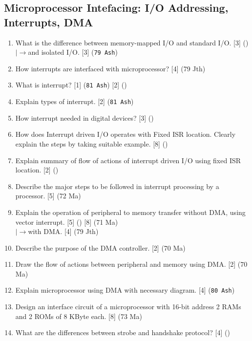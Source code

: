 \documentclass[12pt]{article}
\newcommand{\lb}{\\$\left|\rightarrow\right.$}
\begin{document}
  \subsection{Microprocessor Intefacing: I/O Addressing, Interrupts, DMA}
    \begin{enumerate}
      \item What is the difference between memory-mapped I/O and standard I/O. \hfill [3] ()
        \lb and isolated I/O. \hfill [3] (\texttt{79 Ash})

      \item How interrupts are interfaced with microprocessor? \hfill [4] (79 Jth)

      \item What is interrupt? \hfill [1] (\texttt{81 Ash}) [2] ()

      \item Explain types of interrupt. \hfill [2] (\texttt{81 Ash})

      \item How interrupt needed in digital devices? \hfill [3] ()

      \item How does Interrupt driven I/O operates with Fixed ISR location. Clearly explain the steps by taking suitable example. \hfill [8] ()

      \item Explain summary of flow of actions of interrupt driven I/O using fixed ISR location. \hfill [2] ()
   
      \item Describe the major steps to be followed in interrupt processing by a processor. \hfill [5] (72 Ma)

      \item Explain the operation of peripheral to memory transfer without DMA, using vector interrupt. \hfill [5] () [8] (71 Ma)
        \lb with DMA. \hfill [4] (79 Jth)

      \item Describe the purpose of the DMA controller. \hfill [2] (70 Ma)

      \item Draw the flow of actions between peripheral and memory using DMA. \hfill [2] (70 Ma)

      \item Explain microprocessor using DMA with necessary diagram. \hfill [4] (\texttt{80 Ash})

      \item Design an interface circuit of a microprocessor with 16-bit address 2 RAMs and 2 ROMs of 8 KByte each. \hfill [8] (73 Ma)

      \item What are the differences between strobe and handshake protocol? \hfill [4] ()
    \end{enumerate}
\end{document}
